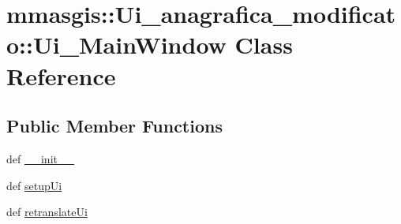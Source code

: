 \hypertarget{classmmasgis_1_1Ui__anagrafica__modificato_1_1Ui__MainWindow}{
\section{mmasgis::Ui\_\-anagrafica\_\-modificato::Ui\_\-MainWindow Class Reference}
\label{classmmasgis_1_1Ui__anagrafica__modificato_1_1Ui__MainWindow}
}
\subsection*{Public Member Functions}
\begin{DoxyCompactItemize}
\item 
def \hyperlink{classmmasgis_1_1Ui__anagrafica__modificato_1_1Ui__MainWindow_a6c88166b901de82b8703b5ac8e0bf662}{\_\-\_\-init\_\-\_\-}
\item 
def \hyperlink{classmmasgis_1_1Ui__anagrafica__modificato_1_1Ui__MainWindow_a0189521f57ead26342a52b56242eb301}{setupUi}
\item 
def \hyperlink{classmmasgis_1_1Ui__anagrafica__modificato_1_1Ui__MainWindow_ab02db19d0debb3a1141c65ebe072c849}{retranslateUi}
\end{DoxyCompactItemize}
